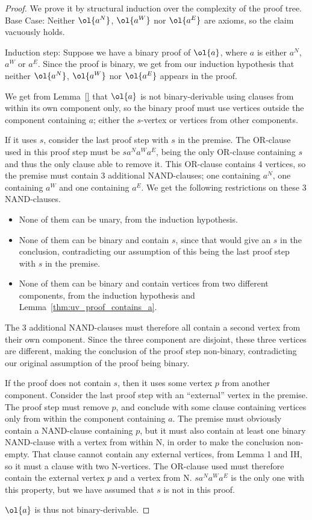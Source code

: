 \begin{proof}
  We prove it by structural induction over the complexity of the proof tree.
  Base Case:
  Neither $\ol{a^N}$, $\ol{a^W}$ nor $\ol{a^E}$ are axioms, so the claim vacuously holds.

  Induction step:
  Suppose we have a binary proof of $\ol{a}$, where $a$ is either $a^N$, $a^W$ or $a^E$.
  Since the proof is binary, we get from our induction hypothesis that neither $\ol{a^N}$, $\ol{a^W}$ nor $\ol{a^E}$ appears in the proof.

  We get from Lemma~\ref{} that $\ol{a}$ is not binary-derivable using clauses from within its own component only, so the binary proof must use vertices outside the component containing $a$; either the $s$-vertex or vertices from other components.

  If it uses $s$, consider the last proof step with $s$ in the premise.
  The OR-clause used in this proof step must be $sa^Na^Wa^E$, being the only OR-clause containing $s$ and thus the only clause able to remove it.
  This OR-clause contains 4 vertices, so the premise must contain 3 additional NAND-clauses;
  one containing $a^N$, one containing $a^W$ and one containing $a^E$.
  We get the following restrictions on these 3 NAND-clauses.
  \begin{itemize}
    \item None of them can be unary, from the induction hypothesis.
    \item None of them can be binary and contain $s$, since that would give an $s$ in the conclusion, contradicting our assumption of this being the last proof step with $s$ in the premise.
    \item None of them can be binary and contain vertices from two different components, from the induction hypothesis and Lemma~\ref{thm:uv_proof_contains_a}.
  \end{itemize}
  The 3 additional NAND-clauses must therefore all contain a second vertex from their own component.
  Since the three component are disjoint, these three vertices are different, making the conclusion of the proof step non-binary, contradicting our original assumption of the proof being binary.

  If the proof does not contain $s$, then it uses some vertex $p$ from another component.
  Consider the last proof step with an ``external'' vertex in the premise.
  The proof step must remove $p$, and conclude with some clause containing vertices only from within the component containing $a$.
  The premise must obviously contain a NAND-clause containing $p$, but it must also contain at least one binary NAND-clause with a vertex from within N, in order to make the conclusion non-empty.
  That clause cannot contain any external vertices, from Lemma 1 and IH, so it must a clause with two N-vertices.
  The OR-clause used must therefore contain the external vertex $p$ and a vertex from N.
  $sa^Na^Wa^E$ is the only one with this property, but we have assumed that $s$ is not in this proof.

  $\ol{a}$ is thus not binary-derivable.

\end{proof}

